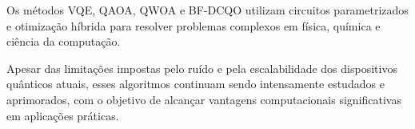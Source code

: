 \documentclass[a4paper,12pt]{article}
\newcommand{\printingbibliography}{%

    \pagestyle{myheadings}
    \markright{}
    \sloppy
    \printbibliography[heading=bibintoc, %
                   title=Refer\^encias %
                  ]
    \fussy%
}
\begin{document}
Os métodos \colorbox{green!20}{VQE, QAOA, QWOA e BF-DCQO utilizam circuitos parametrizados} e otimização 
híbrida para resolver problemas complexos em física, química e ciência da computação.

Apesar das limitações impostas pelo ruído e pela escalabilidade dos dispositivos 
quânticos atuais, esses algoritmos continuam sendo intensamente estudados e aprimorados, 
com o objetivo de alcançar vantagens computacionais significativas em aplicações práticas.


\printingbibliography
\end{document}

